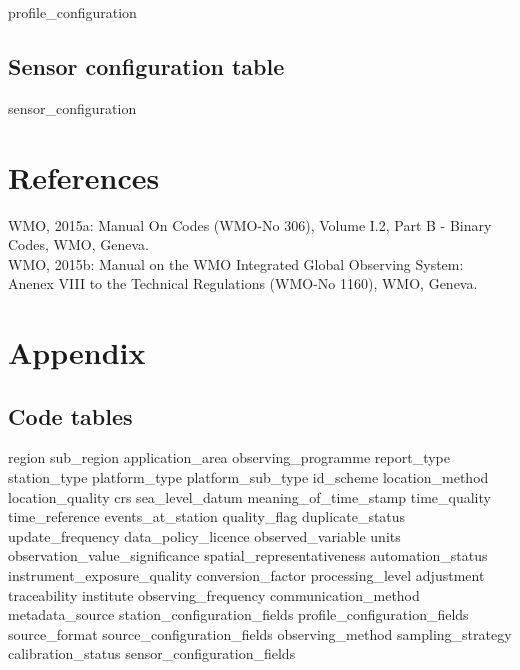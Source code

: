 \documentclass[a4paper]{article}
\begin{document}
 {profile_configuration}

\subsection {Sensor configuration table}

 {sensor_configuration}

\section {References}

\noindent WMO, 2015a: Manual On Codes (WMO-No 306), Volume I.2, Part B - Binary Codes, WMO, Geneva.\\
\noindent WMO, 2015b:  Manual on the WMO Integrated Global Observing System: Anenex VIII to the Technical Regulations (WMO-No 1160), WMO, Geneva.


\section {Appendix}

\subsection {Code tables}

 {region}
 {sub_region}
 {application_area}
 {observing_programme}
 {report_type}
 {station_type}
 {platform_type}
 {platform_sub_type}
 {id_scheme}
 {location_method}
 {location_quality}
 {crs}
 {sea_level_datum}
 {meaning_of_time_stamp}
 {time_quality}
 {time_reference}
 {events_at_station}
 {quality_flag}
 {duplicate_status}
 {update_frequency}
 {data_policy_licence}
 {observed_variable}
 {units}
 {observation_value_significance}
 {spatial_representativeness}
 {automation_status}
 {instrument_exposure_quality}
 {conversion_factor}
 {processing_level}
 {adjustment}
 {traceability}
 {institute}
 {observing_frequency}
 {communication_method}
 {metadata_source}
 {station_configuration_fields}
 {profile_configuration_fields}
 {source_format}
 {source_configuration_fields}
 {observing_method}
 {sampling_strategy}
 {calibration_status}
 {sensor_configuration_fields}
\end{document}
